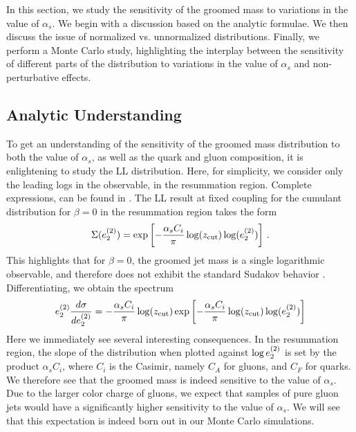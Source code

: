 
In this section, we study the sensitivity of the groomed mass to variations in the value of $\alpha_s$. We begin with a discussion based on the analytic formulae. We then discuss the issue of normalized vs. unnormalized distributions. Finally, we perform a Monte Carlo study, highlighting the interplay between the sensitivity of different parts of the distribution to variations in the value of $\alpha_s$ and non-perturbative effects.


\subsection{Analytic Understanding}\label{sec:analytic}

To get an understanding of the sensitivity of the groomed mass distribution to both the value of $\alpha_s$, as well as the quark and gluon composition, it is enlightening to study the LL distribution. Here, for simplicity, we consider only the leading logs in the observable, in the resummation region. Complete expressions, can be found in \cite{Larkoski:2014wba,Frye:2016aiz,Marzani:2017kqd,Marzani:2017mva}. The LL result at fixed coupling for the cumulant distribution for $\beta=0$ in the resummation region takes the form
\begin{align}
\Sigma(e_{2}^{(2)})=\exp\left[ - \frac{\alpha_s C_i}{\pi} \log(z_{\rm cut}) \log (e_{2}^{(2)}) \right]\,.
\end{align}
This highlights that for $\beta=0$, the groomed jet mass is a single
logarithmic observable, and therefore does not exhibit the standard
Sudakov behavior .  Differentiating, we obtain
  the spectrum
\begin{align}
e_{2}^{(2)}  \frac{d\sigma}{d e_{2}^{(2)}}=   - \frac{\alpha_s C_i}{\pi} \log(z_{\rm cut})   \exp\left[ - \frac{\alpha_s C_i}{\pi}  \log(z_{\rm cut}) \log (e_{2}^{(2)}) \right]
\end{align}
Here we immediately see several interesting consequences. In the resummation region, the slope of the distribution when plotted against $\log e_{2}^{(2)}$ is set by the product $\alpha_s C_i$, where $C_i$ is the Casimir, namely $C_A$ for gluons, and $C_F$ for quarks. We therefore see that the groomed mass is indeed sensitive to the value of $\alpha_s$. Due to the larger color charge of gluons, we expect that samples of pure gluon jets would have a significantly higher sensitivity to the value of $\alpha_s$.  We will see that this expectation is indeed born out in our Monte Carlo simulations.  

